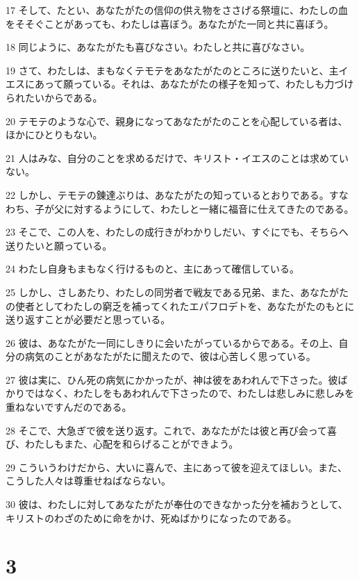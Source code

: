 \par 17 そして、たとい、あなたがたの信仰の供え物をささげる祭壇に、わたしの血をそそぐことがあっても、わたしは喜ぼう。あなたがた一同と共に喜ぼう。
\par 18 同じように、あなたがたも喜びなさい。わたしと共に喜びなさい。
\par 19 さて、わたしは、まもなくテモテをあなたがたのところに送りたいと、主イエスにあって願っている。それは、あなたがたの様子を知って、わたしも力づけられたいからである。
\par 20 テモテのような心で、親身になってあなたがたのことを心配している者は、ほかにひとりもない。
\par 21 人はみな、自分のことを求めるだけで、キリスト・イエスのことは求めていない。
\par 22 しかし、テモテの錬達ぶりは、あなたがたの知っているとおりである。すなわち、子が父に対するようにして、わたしと一緒に福音に仕えてきたのである。
\par 23 そこで、この人を、わたしの成行きがわかりしだい、すぐにでも、そちらへ送りたいと願っている。
\par 24 わたし自身もまもなく行けるものと、主にあって確信している。
\par 25 しかし、さしあたり、わたしの同労者で戦友である兄弟、また、あなたがたの使者としてわたしの窮乏を補ってくれたエパフロデトを、あなたがたのもとに送り返すことが必要だと思っている。
\par 26 彼は、あなたがた一同にしきりに会いたがっているからである。その上、自分の病気のことがあなたがたに聞えたので、彼は心苦しく思っている。
\par 27 彼は実に、ひん死の病気にかかったが、神は彼をあわれんで下さった。彼ばかりではなく、わたしをもあわれんで下さったので、わたしは悲しみに悲しみを重ねないですんだのである。
\par 28 そこで、大急ぎで彼を送り返す。これで、あなたがたは彼と再び会って喜び、わたしもまた、心配を和らげることができよう。
\par 29 こういうわけだから、大いに喜んで、主にあって彼を迎えてほしい。また、こうした人々は尊重せねばならない。
\par 30 彼は、わたしに対してあなたがたが奉仕のできなかった分を補おうとして、キリストのわざのために命をかけ、死ぬばかりになったのである。

\chapter{3}

